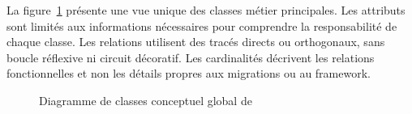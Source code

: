 La figure~\ref{fig:conceptual-domain-model} présente une vue unique des classes
métier principales. Les attributs sont limités aux informations nécessaires pour
comprendre la responsabilité de chaque classe. Les relations utilisent des
tracés directs ou orthogonaux, sans boucle réflexive ni circuit décoratif. Les
cardinalités décrivent les relations fonctionnelles et non les détails propres
aux migrations ou au framework.

\begin{figure}[H]
  \centering
  \resizebox{0.96\textwidth}{!}{}
  \caption{Diagramme de classes conceptuel global de \ProjectName{}}
  \label{fig:conceptual-domain-model}
\end{figure}
